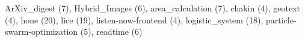 ArXiv\_digest (7), Hybrid\_Images (6), area\_calculation (7), chakin (4), geotext (4), hone (20), lice (19), listen-now-frontend (4), logistic\_system (18), particle-swarm-optimization (5), readtime (6)
